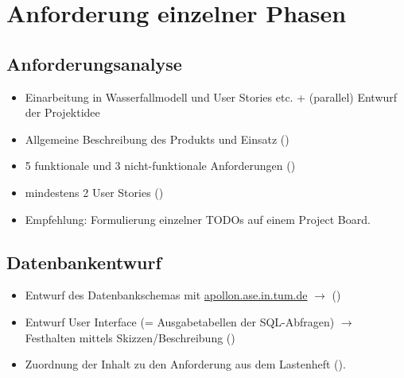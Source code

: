 {

\section{Anforderung einzelner Phasen}

\subsection{Anforderungsanalyse}
\begin{itemize}
    \item Einarbeitung in Wasserfallmodell und User Stories etc. + (parallel) Entwurf der Projektidee
    \item Allgemeine Beschreibung des Produkts und Einsatz ()
    \item 5 funktionale und 3 nicht-funktionale Anforderungen ()
    \item mindestens 2 User Stories ()
    \item Empfehlung: Formulierung einzelner TODOs auf einem Project Board.
\end{itemize}

\subsection{Datenbankentwurf}
\begin{itemize}
    \item Entwurf des Datenbankschemas mit \url{apollon.ase.in.tum.de}
    $\rightarrow$  ()
    \item Entwurf User Interface (= Ausgabetabellen der SQL-Abfragen)
    $\rightarrow$ Festhalten mittels Skizzen/Beschreibung ()
    \item Zuordnung der Inhalt zu den Anforderung aus dem Lastenheft ().
\end{itemize}

}
